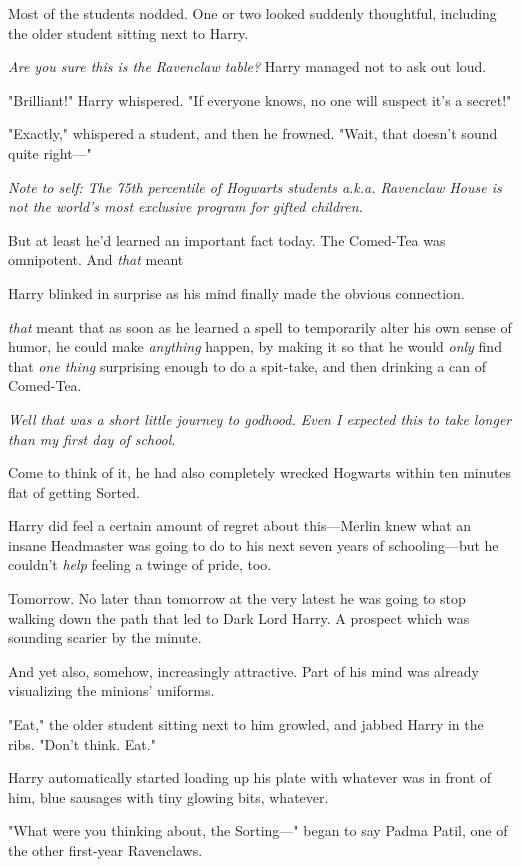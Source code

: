 Most of the students nodded. One or two looked suddenly thoughtful, including
the older student sitting next to Harry.

\emph{Are you sure this is the Ravenclaw table?} Harry managed not to ask out
loud.

"Brilliant!" Harry whispered. "If everyone knows, no one will suspect it's a
secret!"

"Exactly," whispered a student, and then he frowned. "Wait, that doesn't sound
quite right—"

\emph{Note to self: The 75th percentile of Hogwarts students a.k.a. Ravenclaw
House is not the world's most exclusive program for gifted children.}

But at least he'd learned an important fact today. The Comed-Tea was
omnipotent. And \emph{that} meant{\el}

Harry blinked in surprise as his mind finally made the obvious connection.

{\el} \emph{that} meant that as soon as he learned a spell to temporarily
alter his own sense of humor, he could make \emph{anything} happen, by making
it so that he would \emph{only} find that \emph{one thing} surprising enough to
do a spit-take, and then drinking a can of Comed-Tea.

\emph{Well that was a short little journey to godhood. Even I expected this to
take longer than my first day of school.}

Come to think of it, he had also completely wrecked Hogwarts within ten minutes
flat of getting Sorted.

Harry did feel a certain amount of regret about this—Merlin knew what an
insane Headmaster was going to do to his next seven years of schooling—but he
couldn't \emph{help} feeling a twinge of pride, too.

Tomorrow. No later than tomorrow at the very latest he was going to stop
walking down the path that led to Dark Lord Harry. A prospect which was
sounding scarier by the minute.

And yet also, somehow, increasingly attractive. Part of his mind was already
visualizing the minions' uniforms.

"Eat," the older student sitting next to him growled, and jabbed Harry in the
ribs. "Don't think. Eat."

Harry automatically started loading up his plate with whatever was in front of
him, blue sausages with tiny glowing bits, whatever.

"What were you thinking about, the Sorting—" began to say Padma Patil, one of
the other first-year Ravenclaws.

